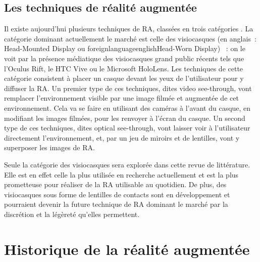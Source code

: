 \subsection*{Les techniques de réalité augmentée}
Il existe aujourd'hui plusieurs techniques de RA, classées en trois catégories . La catégorie dominant actuellement le marché est celle des visiocasques (en anglais~: \foreignlanguage{english}{Head-Mounted Display} ou foreignlanguage{english}{Head-Worn Display}) \citep{VanKrevelenPoelman2010}~: on le voit par la présence médiatique des visiocasques grand public récents tels que l'Oculus Rift, le HTC Vive ou le Microsoft HoloLens. Les techniques de cette catégorie consistent à placer un casque devant les yeux de l'utilisateur pour y diffuser la RA. Un premier type de ces techniques, dites \foreignlanguage{english}{video see-through}, vont remplacer l'environnement visible par une image filmée et augmentée de cet environnement. Cela va se faire en utilisant des caméras à l'avant du casque, en modifiant les images filmées, pour les renvoyer à l'écran du casque. Un second type de ces techniques, dites \foreignlanguage{english}{optical see-through}, vont laisser voir à l'utilisateur directement l'environnement, et, par un jeu de miroirs et de lentilles, vont y superposer les images de RA.


Seule la catégorie des visiocasques sera explorée dans cette revue de littérature. Elle est en effet celle la plus utilisée en recherche actuellement et est la plus prometteuse pour réaliser de la RA utilisable au quotidien. \cite{CarmignianiFurhtAnisettiEtAl2011} De plus, des visiocasques sous forme de lentilles de contacts sont en développement et pourraient devenir la future technique de RA dominant le marché par la discrétion et la légèreté qu'elles permettent. \citep{VanKrevelenPoelman2010}




\section*{Historique de la réalité augmentée}
